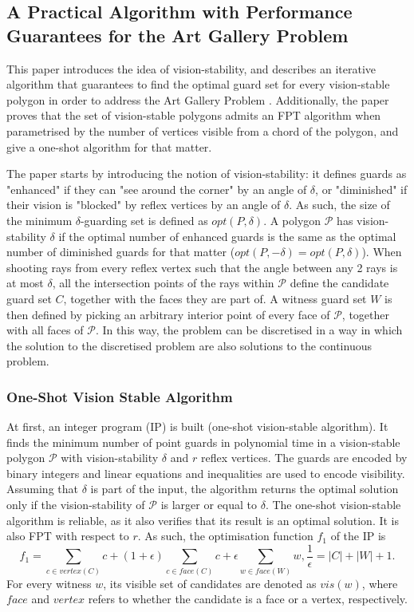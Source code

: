 \subsection{A Practical Algorithm with Performance Guarantees for the Art Gallery Problem \cite{DBLP:journals/corr/abs-2007-06920}}
This paper \cite{DBLP:journals/corr/abs-2007-06920} introduces the idea of vision-stability, and describes an iterative algorithm that guarantees to find the optimal guard set for every vision-stable polygon in order to address the Art Gallery Problem \cite{o1987art}. Additionally, the paper \cite{DBLP:journals/corr/abs-2007-06920} proves that the set of vision-stable polygons admits an FPT algorithm when parametrised by the number of vertices visible from a chord of the polygon, and give a one-shot algorithm for that matter.

The paper \cite{DBLP:journals/corr/abs-2007-06920} starts by introducing the notion of vision-stability: it defines guards as "enhanced" if they can "see around the corner" by an angle of $\delta$, or "diminished" if their vision is "blocked" by reflex vertices by an angle of $\delta$. As such, the size of the minimum $\delta$-guarding set is defined as $opt(P, \delta)$. A polygon $\mathcal P$ has vision-stability $\delta$ if the optimal number of enhanced guards is the same as the optimal number of diminished guards for that matter ($opt(P, -\delta) = opt(P, \delta)$). When shooting rays from every reflex vertex such that the angle between any 2 rays is at most $\delta$, all the intersection points of the rays within $\mathcal P$ define the candidate guard set $C$, together with the faces they are part of. A witness guard set $W$ is then defined by picking an arbitrary interior point of every face of $\mathcal P$, together with all faces of $\mathcal P$. In this way, the problem can be discretised in a way in which the solution to the discretised problem are also solutions to the continuous problem.

\subsubsection{One-Shot Vision Stable Algorithm}
At first, an integer program (IP) is built (one-shot vision-stable algorithm). It finds the minimum number of point guards in polynomial time in a vision-stable polygon $\mathcal P$ with  vision-stability $\delta$ and $r$ reflex vertices. The guards are encoded by binary integers and linear equations and inequalities are used to encode visibility. Assuming that $\delta$ is part of the input, the algorithm returns the optimal solution only if the vision-stability of $\mathcal P$ is larger or equal to $\delta$. The one-shot vision-stable algorithm is reliable, as it also verifies that its result is an optimal solution. It is also FPT with respect to $r$. As such, the optimisation function $f_1$ of the IP is $$f_1 = \sum_{c \in vertex(C)} c + (1 + \epsilon)\sum_{c \in face(C)} c + \epsilon \sum_{w \in face(W)} w, \frac 1 \epsilon = |C| + |W| + 1.$$ For every witness $w$, its visible set of candidates are denoted as $vis(w)$, where $face$ and $vertex$ refers to whether the candidate is a face or a vertex, respectively.

